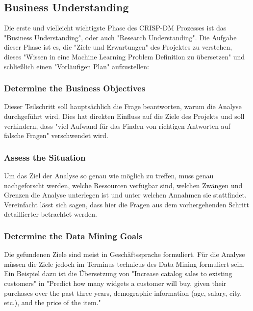 \subsection{Business Understanding}
Die erste und vielleicht wichtigste Phase\citep[S.~14]{shearer_crisp-dm_2000} des CRISP-DM Prozesses ist das "Business Understanding", oder auch "Research Understanding"\citep[Punkt 1.4.1.1]{larose_discovering_2014}. Die Aufgabe dieser Phase ist es, die "Ziele und Erwartungen"\citep[S.~73]{swamynathan_mastering_2017} des Projektes zu verstehen, dieses "Wissen in eine Machine Learning Problem Definition zu übersetzen" und schließlich einen "Vorläufigen Plan"\citep[S.~14]{shearer_crisp-dm_2000} aufzustellen: 
\subsubsection{Determine the Business Objectives}
Dieser Teilschritt soll hauptsächlich die Frage beantworten, warum die Analyse durchgeführt wird. Dies hat direkten Einfluss auf die Ziele des Projekts und soll verhindern, dass "viel Aufwand für das Finden von richtigen Antworten auf falsche Fragen"\citep[S.~14]{chapman_crisp-dm_2000} verschwendet wird.
\subsubsection{Assess the Situation}
Um das Ziel der Analyse so genau wie möglich zu treffen, muss genau nachgeforscht werden, welche Ressourcen verfügbar sind, welchen Zwängen und Grenzen die Analyse unterlegen ist und unter welchen Annahmen sie stattfindet.\citep[S.~14]{chapman_crisp-dm_2000} Vereinfacht lässt sich sagen, dass hier die Fragen aus dem vorhergehenden Schritt detaillierter betrachtet werden.
\subsubsection{Determine the Data Mining Goals}
Die gefundenen Ziele sind meist in Geschäftssprache formuliert. Für die Analyse müssen die Ziele jedoch im Terminus technicus des Data Mining formuliert sein. Ein Beispiel dazu ist die Übersetzung von "Increase catalog sales to existing customers" in "Predict how many widgets a customer will buy, given their purchases over the
past three years, demographic information (age, salary, city, etc.), and the price of the item."\citep[S.~16]{chapman_crisp-dm_2000}
